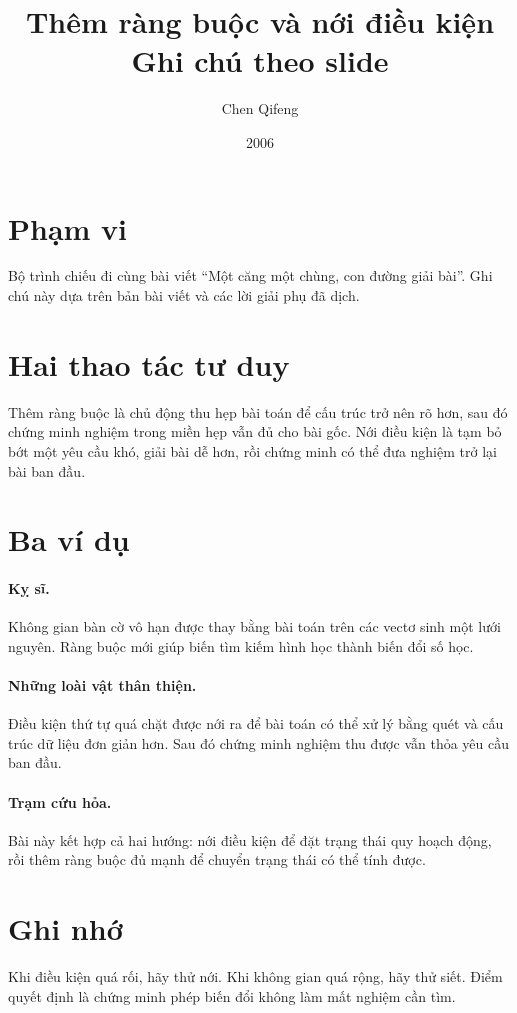 \documentclass[11pt]{article}
\title{Thêm ràng buộc và nới điều kiện\\{\large Ghi chú theo slide}}
\author{Chen Qifeng}
\date{2006}
\begin{document}
\maketitle


\section{Phạm vi}

Bộ trình chiếu đi cùng bài viết ``Một căng một chùng, con đường giải bài''.
Ghi chú này dựa trên bản bài viết và các lời giải phụ đã dịch.

\section{Hai thao tác tư duy}

Thêm ràng buộc là chủ động thu hẹp bài toán để cấu trúc trở nên rõ hơn, sau đó
chứng minh nghiệm trong miền hẹp vẫn đủ cho bài gốc. Nới điều kiện là tạm bỏ
bớt một yêu cầu khó, giải bài dễ hơn, rồi chứng minh có thể đưa nghiệm trở
lại bài ban đầu.

\section{Ba ví dụ}

\paragraph{Kỵ sĩ.}
Không gian bàn cờ vô hạn được thay bằng bài toán trên các vectơ sinh một lưới
nguyên. Ràng buộc mới giúp biến tìm kiếm hình học thành biến đổi số học.

\paragraph{Những loài vật thân thiện.}
Điều kiện thứ tự quá chặt được nới ra để bài toán có thể xử lý bằng quét và
cấu trúc dữ liệu đơn giản hơn. Sau đó chứng minh nghiệm thu được vẫn thỏa yêu
cầu ban đầu.

\paragraph{Trạm cứu hỏa.}
Bài này kết hợp cả hai hướng: nới điều kiện để đặt trạng thái quy hoạch động,
rồi thêm ràng buộc đủ mạnh để chuyển trạng thái có thể tính được.

\section{Ghi nhớ}

Khi điều kiện quá rối, hãy thử nới. Khi không gian quá rộng, hãy thử siết.
Điểm quyết định là chứng minh phép biến đổi không làm mất nghiệm cần tìm.
\end{document}
